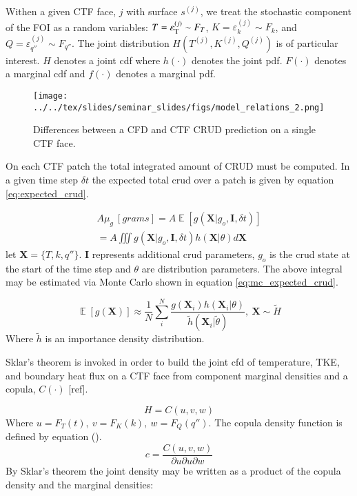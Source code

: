 \documentclass{anstrans}
\DeclareMathOperator*{\E}{\mathbb{E}}
\begin{document}
Withen a given CTF face, $j$ with surface $s^{(j)}$, we treat the stochastic component of the FOI as a random variables: $T=\varepsilon^{(j)}_{\text T} \sim F_T$,  $ K=\varepsilon^{(j)}_k \sim F_k$, and $Q=\varepsilon^{(j)}_{q''} \sim F_{q''}$.  The joint distribution $H(T^{(j)}, K^{(j)}, Q^{(j)})$ is of particular interest. $H$ denotes a joint cdf where $h(\cdot)$ denotes the joint pdf. $F(\cdot)$ denotes a marginal cdf and $f(\cdot)$ denotes a marginal pdf.

\begin{figure}[h]
  \texttt{[image: ../../tex/slides/seminar\_slides/figs/model\_relations\_2.png]}
    \caption{   Differences between a CFD and CTF CRUD prediction on a single CTF face.}
  \label{fig:cfd_v_ctf}
\end{figure}

On each CTF patch the total integrated amount of CRUD must be computed.  In a given time step $\delta t$ the expected total crud over a patch is given by equation \ref{eq:expected_crud}.

\begin{eqnarray}
	A \mu_g\ [grams] = A \E[g(\mathbf X|g_o, \mathbf I, \delta t)] \nonumber \\
	= A \iiint g(\mathbf X|g_o, \mathbf I, \delta t) h(\mathbf X|\theta) d \mathbf X
	\label{eq:expected_crud}
\end{eqnarray}
let $\mathbf X= \{T, k, q''\}$. $\mathbf I$ represents additional crud parameters, $g_o$ is the crud state at the start of the time step and $\theta$ are distribution parameters.
The above integral may be estimated via Monte Carlo shown in equation \ref{eq:mc_expected_crud}.

\begin{equation}
	\E[g(\mathbf X)] \approx \frac{1}{N} \sum_i^N \frac{g(\mathbf X_i) 
	h(\mathbf X_i | \theta)}{\tilde h(\mathbf X_i | \tilde \theta)}, \ \mathbf X \sim \tilde H
	\label{eq:mc_expected_crud}
\end{equation}
Where $\tilde{h}$ is an importance density distribution.

Sklar's theorem is invoked in order to build the joint cfd of temperature, TKE, and boundary heat flux on a CTF face from component marginal densities and a copula, $C(\cdot)$ [ref].  

\begin{equation}
H = C(u,v,w)
\end{equation}
Where $u=F_T(t),\ v=F_K(k),\ w=F_Q(q'')$. The copula density function is defined by equation ().
\begin{equation}
c = \frac{C(u,v,w)}{\partial u \partial u \partial w}
\end{equation}
By Sklar's theorem the joint density may be written as a product of the copula density and the marginal densities:
\end{document}

